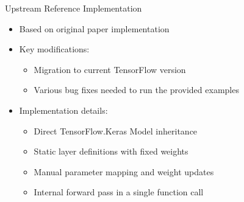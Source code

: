 \documentclass{beamer}
\begin{document}
\begin{frame}{Upstream Reference Implementation}
    \begin{itemize}
        \item Based on original paper implementation
        \item Key modifications:
        \begin{itemize}
            \item Migration to current TensorFlow version
            \item Various bug fixes needed to run the provided examples
        \end{itemize}
        \item Implementation details:
        \begin{itemize}
            \item Direct TensorFlow.Keras Model inheritance
            \item Static layer definitions with fixed weights
            \item Manual parameter mapping and weight updates
            \item Internal forward pass in a single function call
        \end{itemize}
    \end{itemize}
\end{frame}
\end{document}
